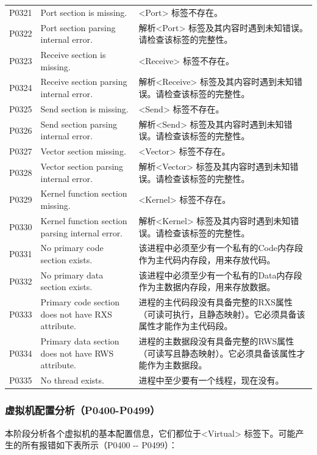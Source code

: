 \begin{xltabular}{\textwidth}{@{}>{\hsize\raggedright\arraybackslash}X>{\hsize\raggedright\arraybackslash}X>{\hsize\raggedright\arraybackslash}X@{}}
P0321 & Port section is missing. &
<Port> 标签不存在。\tabularnewline
P0322 & Port section parsing internal error. &
解析<Port> 标签及其内容时遇到未知错误。请检查该标签的完整性。\tabularnewline
P0323 & Receive section is missing. &
<Receive> 标签不存在。\tabularnewline
P0324 & Receive section parsing internal error. &
解析<Receive> 标签及其内容时遇到未知错误。请检查该标签的完整性。\tabularnewline
P0325 & Send section is missing. &
<Send> 标签不存在。\tabularnewline
P0326 & Send section parsing internal error. &
解析<Send> 标签及其内容时遇到未知错误。请检查该标签的完整性。\tabularnewline
P0327 & Vector section missing. &
<Vector> 标签不存在。\tabularnewline
P0328 & Vector section parsing internal error. &
解析<Vector> 标签及其内容时遇到未知错误。请检查该标签的完整性。\tabularnewline
P0329 & Kernel function section missing. &
<Kernel> 标签不存在。\tabularnewline
P0330 & Kernel function section parsing internal error. &
解析<Kernel> 标签及其内容时遇到未知错误。请检查该标签的完整性。\tabularnewline
P0331 & No primary code section exists. &
该进程中必须至少有一个私有的Code内存段作为主代码内存段，用来存放代码。\tabularnewline
P0332 & No primary data section exists. &
该进程中必须至少有一个私有的Data内存段作为主数据内存段，用来存放数据。\tabularnewline
P0333 & Primary code section does not have RXS attribute. &
进程的主代码段没有具备完整的RXS属性（可读可执行，且静态映射）。它必须具备该属性才能作为主代码段。\tabularnewline
P0334 & Primary data section does not have RWS attribute. &
进程的主数据段没有具备完整的RWS属性（可读写且静态映射）。它必须具备该属性才能作为主数据段。\tabularnewline
P0335 & No thread exists. &
进程中至少要有一个线程，现在没有。\tabularnewline
\end{xltabular}

\subsubsection{虚拟机配置分析（P0400-P0499）}\label{subsubsec:5-6-2-5}

本阶段分析各个虚拟机的基本配置信息，它们都位于<Virtual> 标签下。可能产生的所有报错如下表所示（P0400
-\/- P0499）：


